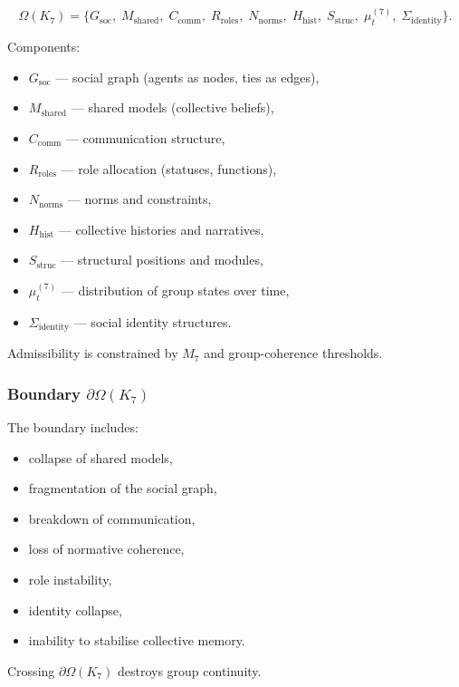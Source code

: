 \[
\Omega(K_7)=
\{
G_{\mathrm{soc}},\;
M_{\mathrm{shared}},\;
C_{\mathrm{comm}},\;
R_{\mathrm{roles}},\;
N_{\mathrm{norms}},\;
H_{\mathrm{hist}},\;
S_{\mathrm{struc}},\;
\mu^{(7)}_t,\;
\Sigma_{\mathrm{identity}}
\}.
\]

Components:
\begin{itemize}
    \item $G_{\mathrm{soc}}$ — social graph (agents as nodes, ties as edges),
    \item $M_{\mathrm{shared}}$ — shared models (collective beliefs),
    \item $C_{\mathrm{comm}}$ — communication structure,
    \item $R_{\mathrm{roles}}$ — role allocation (statuses, functions),
    \item $N_{\mathrm{norms}}$ — norms and constraints,
    \item $H_{\mathrm{hist}}$ — collective histories and narratives,
    \item $S_{\mathrm{struc}}$ — structural positions and modules,
    \item $\mu^{(7)}_t$ — distribution of group states over time,
    \item $\Sigma_{\mathrm{identity}}$ — social identity structures.
\end{itemize}

Admissibility is constrained by $M_7$ and group-coherence thresholds.

\subsubsection{Boundary \texorpdfstring{$\partial\Omega(K_7)$}{\partial\Omega(K_7)}}

The boundary includes:
\begin{itemize}
    \item collapse of shared models,
    \item fragmentation of the social graph,
    \item breakdown of communication,
    \item loss of normative coherence,
    \item role instability,
    \item identity collapse,
    \item inability to stabilise collective memory.
\end{itemize}

Crossing $\partial\Omega(K_7)$ destroys group continuity.


